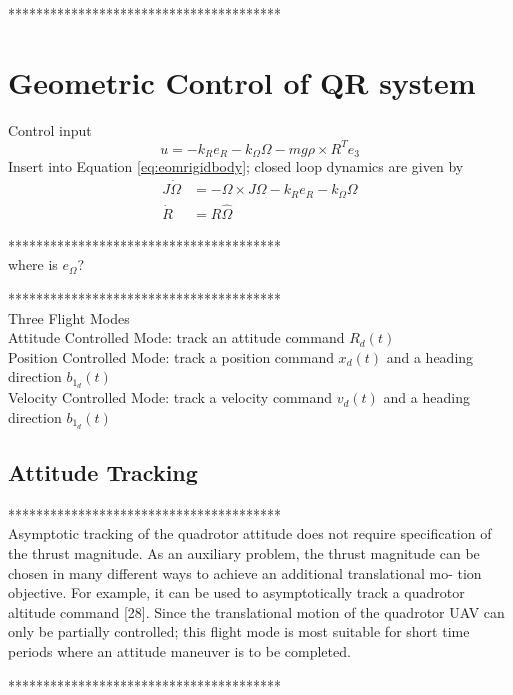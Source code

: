 ***************************************\\

\section{Geometric Control of QR system}

Control input \cite{Lee2011}
\begin{equation}\label{eq:inputattitude}
u=-k_Re_R-k_\Omega\Omega-mg\rho\times R^Te_3
\end{equation}
Insert into Equation \ref{eq:eomrigidbody}; closed loop dynamics are given by
\begin{align}\label{eq:CLdynamics}
J\dot{\Omega} &= -\Omega\times J\Omega-k_Re_R-k_\Omega\Omega \\
\dot{R} &= R\hat{\Omega}
\end{align}

***************************************\\
where is $ e_\Omega $?

***************************************\\

Three Flight Modes \cite{Lee,Lee2010c}\\
Attitude Controlled Mode: track an attitude command $ R_d(t) $ \\
Position Controlled Mode: track a position command $ x_d(t) $ and a heading direction $ b_{1_d}(t) $\\
Velocity Controlled Mode: track a velocity command $ v_d(t) $ and a heading direction $ b_{1_d}(t) $\\

		\subsection{Attitude Tracking}
		***************************************\\
		Asymptotic tracking of the quadrotor attitude does not require specification of the thrust magnitude. As an auxiliary problem, the thrust magnitude can be chosen in many different ways to achieve an additional translational mo- tion objective. For example, it can be used to asymptotically track a quadrotor altitude command [28]. Since the translational motion of the quadrotor UAV can only be partially controlled; this flight mode is most suitable for short time periods where an attitude maneuver is to be completed. \cite{Goodarzi2015b}
		
		***************************************\\


